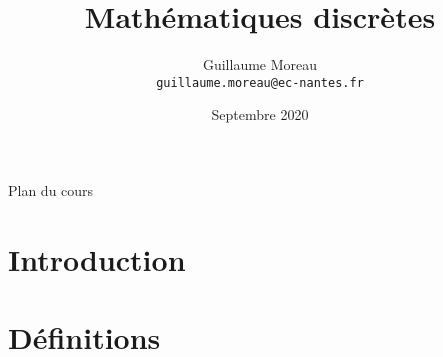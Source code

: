 \documentclass[allowframebreaks,xcolor=dvipsnames]{beamer}
\title[Option INFO / MADIS] %
{Mathématiques discrètes}
\author[G. Moreau]{Guillaume Moreau\\
\texttt{guillaume.moreau@ec-nantes.fr}}
\institute[Ecole Centrale de Nantes] %
{
  Ecole Centrale de Nantes
}
\date %
{Septembre 2020}
\begin{document}
\begin{frame}
  \titlepage
\end{frame}

\begin{frame}[allowframebreaks]{Plan du cours}
  \tableofcontents[hideallsubsections]
\end{frame}



\section{Introduction}


\section{Définitions}


\end{document}

